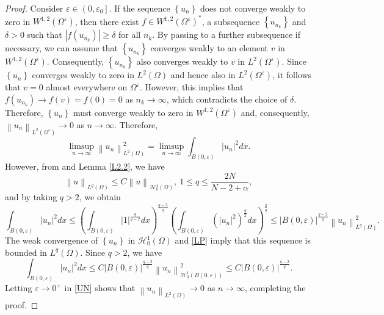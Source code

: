 \documentclass[11pt]{article}
\numberwithin{equation}{section}
\def\Om{\Omega}
\def\mcH{\mathcal{H}}
\begin{document}
\begin{proof}
			Consider $\varepsilon  \in\left(0, \varepsilon _0\right]$.  If the sequence
			$\left\{ u_n\right\}$  does not converge weakly to zero in  $W^{1,2}\left(\Om^{\varepsilon }\right)$,
			then there exist  $f \in W^{1,2}\left(\Om^{\varepsilon }\right)^*$, a subsequence
			$\left\{ u_{n_k}\right\}$ and $\delta>0$  such that
			$\left|f\left( u_{n_k}\right)\right| \geq \delta$
			for all $n_k$. By passing to a further subsequence if necessary, we can assume that
			$\left\{ u_{n_k}\right\}$  converges weakly to an element $v$ in  $W^{1,2}\left(\Om^{\varepsilon }\right)$. Consequently,
			$\left\{ u_{n_k}\right\}$  also converges weakly to $v$ in  $L^2\left(\Om^{\varepsilon }\right)$.  Since $\left\{ u_n\right\}$
			converges weakly to zero in $L^2(\Omega)$ and hence also in  $L^2\left(\Om^{\varepsilon }\right)$,
			it follows that $v=0$ almost everywhere on  $\Om^{\varepsilon }$. However, this implies that
			$f\left( u_{n_k}\right) \rightarrow f(v)=f(0)=0$ as $n_k \rightarrow \infty$, which contradicts the choice of $\delta$. Therefore,
			$\left\{ u_n\right\}$  must converge weakly to zero in  $W^{1,2}\left(\Om^{\varepsilon }\right)$ and, consequently,
			$\left\| u_n\right\|_{L^2\left(\Om^{\varepsilon }\right)} \rightarrow 0$ as $n \rightarrow \infty$.  Therefore,
			\begin{equation}\label{UN}
				\limsup _{n \rightarrow \infty}\left\| u_n\right\|_{L^2(\Om)}^2=\limsup _{n \rightarrow \infty} \int_{B(0, \varepsilon )}\left| u_n\right|^2 d x.
			\end{equation}
			However, from \cite{catrina2001caffarelli} and Lemma \ref{L2.2}, we have
			\begin{equation}\label{LP}
				\left\| u \right\|_{L^q(\Om)} \le C \left\|  u\right\|_{\mcH_0^1(\Om)}, \ 1\le q \le \frac{2N}{N-2+\alpha},
			\end{equation}
			and by taking $q>2$, we obtain
			\begin{equation*}
				\int_{B(0, \varepsilon )}\left| u_n\right|^2 d x \le \left(\int_{B(0, \varepsilon )} |1|^ {\frac{q}{q-2}} dx\right) ^{\frac{q-2}{q}} \left( \int_{B(0, \varepsilon )} \left( | u_n|^2 \right) ^{\frac{q}{2}}dx\right)^{\frac{2}{q}}
				\le |B(0, \varepsilon )|^ {\frac{q-2}{q}} \left\|  u_n \right\| ^2_{L^q(\Om)}.
			\end{equation*}
			The weak convergence of  $\left\{ u_n\right\}$ in $\mcH_0^1(\Om)$ and \eqref{LP} imply that this sequence is bounded in
			$L^q(\Omega)$.  Since $q>2$, we have
			$$
			\int_{B(0, \varepsilon )}\left| u_n\right|^2 d x \le C |B(0,\varepsilon )|^\frac{q-2}{q}\left\|  u_n\right\|^{2}_{\mcH_0^1(B(0, \varepsilon ))}\leq C |B(0,\varepsilon )|^\frac{q-2}{q}.
			$$
			Letting $\varepsilon  \rightarrow 0^+$ in \eqref{UN} shows that $\left\| u_n\right\|_{L^2(\Om)} \rightarrow 0$ as $n \rightarrow \infty$, completing the proof.
		\end{proof}
		
\end{document}
